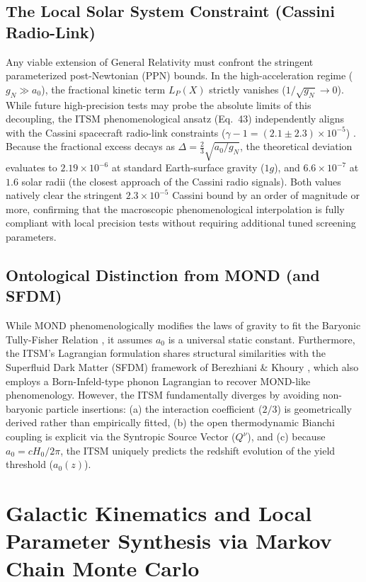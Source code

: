 \documentclass[aps,prd,10pt,twocolumn,superscriptaddress,nofootinbib,floatfix]{revtex4-2}
\begin{document}
\subsection{The Local Solar System Constraint (Cassini Radio-Link)}
Any viable extension of General Relativity must confront the stringent parameterized post-Newtonian (PPN) bounds. In the high-acceleration regime ($g_N \gg a_0$), the fractional kinetic term $L_P(X)$ strictly vanishes ($1/\sqrt{g_N} \to 0$). While future high-precision tests may probe the absolute limits of this decoupling, the ITSM phenomenological ansatz (Eq.~43) independently aligns with the Cassini spacecraft radio-link constraints ($\gamma - 1 = (2.1 \pm 2.3) \times 10^{-5}$) \cite{cassini}. Because the fractional excess decays as $\Delta = \frac{2}{3} \sqrt{a_0 / g_N}$, the theoretical deviation evaluates to $2.19 \times 10^{-6}$ at standard Earth-surface gravity ($1g$), and $6.6 \times 10^{-7}$ at $1.6$ solar radii (the closest approach of the Cassini radio signals). Both values natively clear the stringent $2.3 \times 10^{-5}$ Cassini bound by an order of magnitude or more, confirming that the macroscopic phenomenological interpolation is fully compliant with local precision tests without requiring additional tuned screening parameters.

\subsection{Ontological Distinction from MOND (and SFDM)}
While MOND phenomenologically modifies the laws of gravity to fit the Baryonic Tully-Fisher Relation \cite{mond}, it assumes $a_0$ is a universal static constant. Furthermore, the ITSM's Lagrangian formulation shares structural similarities with the Superfluid Dark Matter (SFDM) framework of Berezhiani \& Khoury \cite{sf_dm}, which also employs a Born-Infeld-type phonon Lagrangian to recover MOND-like phenomenology. However, the ITSM fundamentally diverges by avoiding non-baryonic particle insertions: (a) the interaction coefficient ($2/3$) is geometrically derived rather than empirically fitted, (b) the open thermodynamic Bianchi coupling is explicit via the Syntropic Source Vector ($Q^\nu$), and (c) because $a_0 = c H_0 / 2\pi$, the ITSM uniquely predicts the redshift evolution of the yield threshold ($a_0(z)$).

\section{\label{sec:kinematics}Galactic Kinematics and Local Parameter Synthesis via Markov Chain Monte Carlo}
\end{document}
